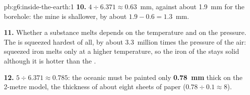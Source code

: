 \begin{solution}{pb:g6:inside-the-earth:1}
\textbf{10.} $4 \div 6.371 \approx 0.63$~mm, against about 1.9~mm for the
borehole: the mine is shallower, by about $1.9 - 0.6 = 1.3$~mm.

\textbf{11.} Whether a substance melts depends on the temperature and on
the pressure. The  is squeezed hardest of all, by about
3.3~million times the pressure of the air: squeezed iron melts only at a
higher temperature, so the iron of the  stays solid although it
is hotter than the .

\textbf{12.} $5 \div 6.371 \approx 0.785$: the oceanic  must be
painted only \textbf{0.78~mm} thick on the 2-metre model, the thickness of
about eight sheets of paper ($0.78 \div 0.1 \approx 8$).
\end{solution}
